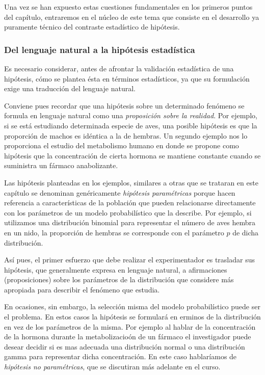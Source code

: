 \documentclass[
]{article}
\begin{document}
Una vez se han expuesto estas cuestiones fundamentales en los primeros puntos del capítulo, entraremos en el núcleo de este tema que consiste en el desarrollo ya puramente técnico del contraste estadístico de hipótesis.

\subsubsection{Del lenguaje natural a la hipótesis estadística}\label{del-lenguaje-natural-a-la-hipuxf3tesis-estaduxedstica}

Es necesario considerar, antes de afrontar la validación estadística de una hipótesis, cómo se plantea ésta en términos estadísticos, ya que su formulación exige una traducción del lenguaje natural.

Conviene pues recordar que una hipótesis sobre un determinado fenómeno se formula en lenguaje natural como una \emph{proposición sobre la realidad}. Por ejemplo, si se está estudiando determinada especie de aves, una posible hipótesis es que la proporción de machos es idéntica a la de hembras. Un segundo ejemplo nos lo proporciona el estudio del metabolismo humano en donde se propone como hipótesis que la concentración de cierta hormona se mantiene constante cuando se suministra un fármaco anabolizante.

Las hipótesis planteadas en los ejemplos, similares a otras que se trataran en este capítulo se denominan genéricamente \emph{hipótesis paramétricas} porque hacen referencia a características de la población que pueden relacionarse directamente con los parámetros de un modelo probabilístico que la describe. Por ejemplo, si utilizamos una distribución binomial para representar el número de aves hembra en un nido, la proporción de hembras se corresponde con el parámetro \(p\) de dicha distribución.

Así pues, el primer esfuerzo que debe realizar el experimentador es trasladar sus hipótesis, que generalmente expresa en lenguaje natural, a afirmaciones (proposiciones) sobre los parámetros de la distribución que considere más apropiada para describir el fenómeno que estudia.

En ocasiones, sin embargo, la selección misma del modelo probabilístico puede ser el problema. En estos casos la hipótesis se formulará en erminos de la distribución en vez de los parámetros de la misma. Por ejemplo al hablar de la concentración de la hormona durante la metabolizacioón de un fármaco el investigador puede desear decidir si es mas adecuada una distribución normal o una distribución gamma para representar dicha concentración. En este caso hablaríamos de \emph{hipótesis no paramétricas}, que se discutiran más adelante en el curso.
\end{document}
